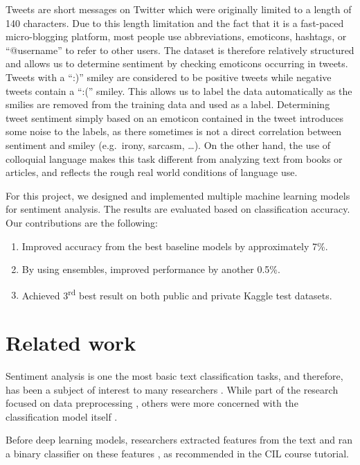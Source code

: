 \documentclass[10pt,conference,compsocconf]{IEEEtran}
\begin{document}
Tweets are short messages on Twitter which were originally limited to a length of 140 characters. Due to this length limitation and the fact that it is a fast-paced micro-blogging platform, most people use abbreviations, emoticons, hashtags, or ``@username'' to refer to other users. The dataset is therefore relatively structured and allows us to determine sentiment by checking emoticons occurring in tweets. Tweets with a ``:)'' smiley are considered to be positive tweets while negative tweets contain a ``:('' smiley. This allows us to label the data automatically as the smilies are removed from the training data and used as a label. Determining tweet sentiment simply based on an emoticon contained in the tweet introduces some noise to the labels, as there sometimes is not a direct correlation between sentiment and smiley (e.g.~irony, sarcasm, \ldots). On the other hand, the use of colloquial language makes this task different from analyzing text from books or articles, and reflects the rough real world conditions of language use. 

For this project, we designed and implemented multiple machine learning models for sentiment analysis. The results are evaluated based on classification accuracy.
Our contributions are the following:
\begin{enumerate}
\item Improved accuracy from the best baseline models by approximately 7\%.
\item By using ensembles, improved performance by another 0.5\%.
\item Achieved 3\textsuperscript{rd} best result on both public and private Kaggle test datasets.
\end{enumerate}

\section{Related work}
Sentiment analysis is one the most basic text classification tasks, and therefore, has been a subject of interest to many researchers
\cite{TextCNN,mozetivc2016multilingual,transformer,twitter_preprocessing,CharTextCNN}. 
While part of the research focused on data preprocessing \cite{twitter_preprocessing}, others were more concerned with the classification model itself \cite{TextCNN}.

Before deep learning models, researchers extracted features from the text and ran a binary classifier on these features \cite{features}, as recommended in the CIL course tutorial.
\end{document}
